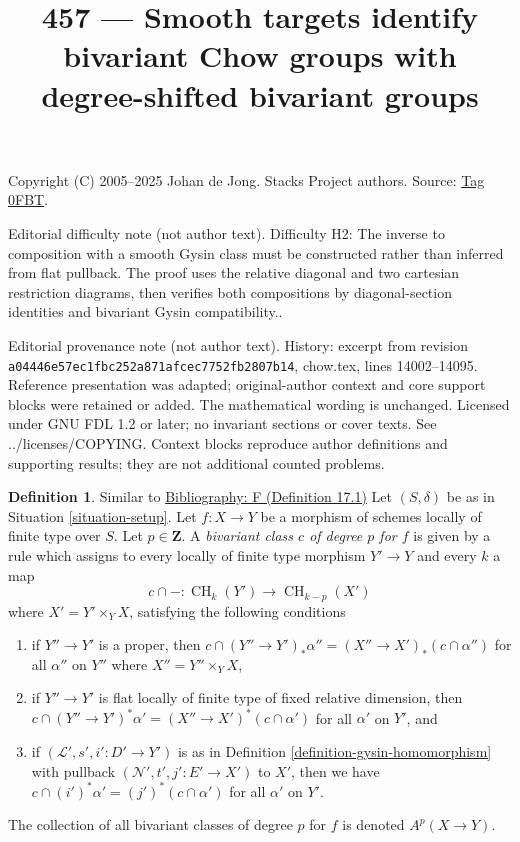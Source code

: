 \documentclass{amsart}
\newenvironment{reference}{\comment}{\endcomment}
\theoremstyle{plain}
\theoremstyle{definition}
\newtheorem{definition}[subsection]{Definition}
\theoremstyle{remark}
\numberwithin{equation}{subsection}
\def\CH{\mathop{\mathrm{CH}}\nolimits}
\begin{document}
\title[Stacks Project, Tag 0FBT]{457 --- Smooth targets identify bivariant Chow groups with degree-shifted bivariant groups}
\maketitle
\noindent Copyright (C) 2005--2025 Johan de Jong. Stacks Project authors. Source: \href{https://stacks.math.columbia.edu/tag/0FBT}{Tag 0FBT}.

\noindent Editorial difficulty note (not author text). Difficulty H2: The inverse to composition with a smooth Gysin class must be constructed rather than inferred from flat pullback. The proof uses the relative diagonal and two cartesian restriction diagrams, then verifies both compositions by diagonal-section identities and bivariant Gysin compatibility..

\noindent Editorial provenance note (not author text). History: excerpt from revision \texttt{a0444\allowbreak 6e57e\allowbreak c1fbc\allowbreak 252a8\allowbreak 71afc\allowbreak ec775\allowbreak 2fb28\allowbreak 07b14}, chow.tex, lines 14002--14095. Reference presentation was adapted; original-author context and core support blocks were retained or added. The mathematical wording is unchanged. Licensed under GNU FDL 1.2 or later; no invariant sections or cover texts. See ../licenses/COPYING. Context blocks reproduce author definitions and supporting results; they are not additional counted problems.

\begin{definition}
\label{definition-bivariant-class}
\begin{reference}
Similar to \href{https://stacks.math.columbia.edu/bibliography}{Bibliography: F (Definition 17.1)}
\end{reference}
Let $(S, \delta)$ be as in Situation \ref{situation-setup}.
Let $f : X \to Y$ be a morphism of schemes locally of finite type over $S$.
Let $p \in \mathbf{Z}$.
A {\it bivariant class $c$ of degree $p$ for $f$} is given by a rule
which assigns to every locally of finite type morphism $Y' \to Y$
and every $k$ a map
$$
c \cap - : \CH_k(Y') \longrightarrow \CH_{k - p}(X')
$$
where $X' = Y' \times_Y X$, satisfying the following conditions
\begin{enumerate}
\item if $Y'' \to Y'$ is a proper, then
$c \cap (Y'' \to Y')_*\alpha'' = (X'' \to X')_*(c \cap \alpha'')$
for all $\alpha''$ on $Y''$ where $X'' = Y'' \times_Y X$,
\item if $Y'' \to Y'$ is flat locally of finite type of
fixed relative dimension, then
$c \cap (Y'' \to Y')^*\alpha' = (X'' \to X')^*(c \cap \alpha')$
for all $\alpha'$ on $Y'$, and
\item if $(\mathcal{L}', s', i' : D' \to Y')$ is as in
Definition \ref{definition-gysin-homomorphism}
with pullback $(\mathcal{N}', t', j' : E' \to X')$ to $X'$,
then we have $c \cap (i')^*\alpha' = (j')^*(c \cap \alpha')$
for all $\alpha'$ on $Y'$.
\end{enumerate}
The collection of all bivariant classes of degree $p$ for $f$ is
denoted $A^p(X \to Y)$.
\end{definition}
\end{document}
